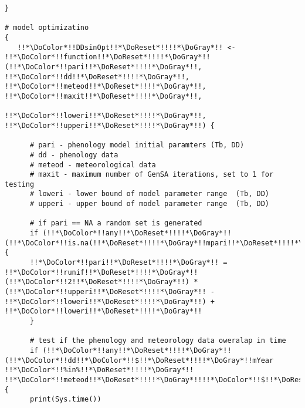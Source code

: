 \begin{verbatim}
}

# model optimizatino
{
   !!*\DoColor*!!DDsinOpt!!*\DoReset*!!!!*\DoGray*!! <- !!*\DoColor*!!function!!*\DoReset*!!!!*\DoGray*!!(!!*\DoColor*!!pari!!*\DoReset*!!!!*\DoGray*!!, !!*\DoColor*!!dd!!*\DoReset*!!!!*\DoGray*!!, !!*\DoColor*!!meteod!!*\DoReset*!!!!*\DoGray*!!, !!*\DoColor*!!maxit!!*\DoReset*!!!!*\DoGray*!!,
                        !!*\DoColor*!!loweri!!*\DoReset*!!!!*\DoGray*!!, !!*\DoColor*!!upperi!!*\DoReset*!!!!*\DoGray*!!) {

      # pari - phenology model initial paramters (Tb, DD)
      # dd - phenology data
      # meteod - meteorological data
      # maxit - maximum number of GenSA iterations, set to 1 for testing
      # loweri - lower bound of model parameter range  (Tb, DD)
      # upperi - upper bound of model parameter range  (Tb, DD)

      # if pari == NA a random set is generated
      if (!!*\DoColor*!!any!!*\DoReset*!!!!*\DoGray*!!(!!*\DoColor*!!is.na(!!*\DoReset*!!!!*\DoGray*!!mpari!!*\DoReset*!!!!*\DoGray*!!))) {
      !!*\DoColor*!!pari!!*\DoReset*!!!!*\DoGray*!! = !!*\DoColor*!!runif!!*\DoReset*!!!!*\DoGray*!!(!!*\DoColor*!!2!!*\DoReset*!!!!*\DoGray*!!) * (!!*\DoColor*!!upperi!!*\DoReset*!!!!*\DoGray*!! - !!*\DoColor*!!loweri!!*\DoReset*!!!!*\DoGray*!!) + !!*\DoColor*!!loweri!!*\DoReset*!!!!*\DoGray*!!
      }

      # test if the phenology and meteorology data oweralap in time
      if (!!*\DoColor*!!any!!*\DoReset*!!!!*\DoGray*!!(!!*\DoColor*!!dd!!*\DoColor*!!$!!*\DoReset*!!!!*\DoGray*!!mYear !!*\DoColor*!!%in%!!*\DoReset*!!!!*\DoGray*!! !!*\DoColor*!!meteod!!*\DoReset*!!!!*\DoGray*!!!!*\DoColor*!!$!!*\DoReset*!!!!*\DoGray*!!Year)) {
      print(Sys.time())


\end{verbatim}
